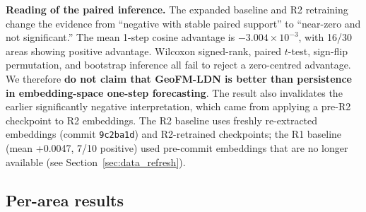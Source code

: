 \documentclass{article}
\begin{document}
\textbf{Reading of the paired inference.} The expanded baseline and R2 retraining change the evidence from ``negative with stable paired support'' to ``near-zero and not significant.'' The mean 1-step cosine advantage is $-3.004\times10^{-3}$, with 16/30 areas showing positive advantage. Wilcoxon signed-rank, paired $t$-test, sign-flip permutation, and bootstrap inference all fail to reject a zero-centred advantage. We therefore \textbf{do not claim that GeoFM-LDN is better than persistence in embedding-space one-step forecasting}. The result also invalidates the earlier significantly negative interpretation, which came from applying a pre-R2 checkpoint to R2 embeddings. The R2 baseline uses freshly re-extracted embeddings (commit \texttt{9c2ba1d}) and R2-retrained checkpoints; the R1 baseline (mean +0.0047, 7/10 positive) used pre-commit embeddings that are no longer available (see Section~\ref{sec:data_refresh}).

\subsection{Per-area results}
\end{document}
